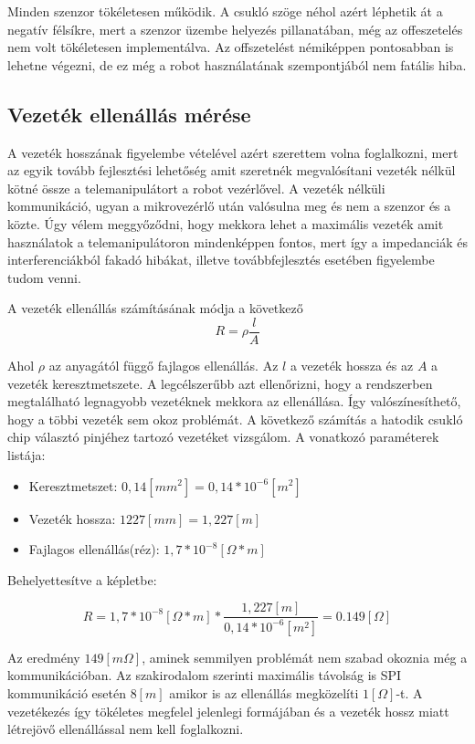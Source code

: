 Minden szenzor tökéletesen működik. A csukló szöge néhol azért léphetik át a negatív félsíkre, mert a szenzor üzembe helyezés pillanatában, még az offeszetelés nem volt tökéletesen implementálva. Az offszetelést némiképpen pontosabban is lehetne végezni, de ez még a robot használatának szempontjából nem fatális hiba.


\subsection{Vezeték ellenállás mérése}

A vezeték hosszának figyelembe vételével azért szerettem volna foglalkozni, mert az egyik tovább fejlesztési lehetőség amit szeretnék megvalósítani vezeték nélkül kötné össze a telemanipulátort a robot vezérlővel. A vezeték nélküli kommunikáció, ugyan a mikrovezérlő után valósulna meg és nem a szenzor és a közte. Úgy vélem meggyőződni, hogy mekkora lehet a maximális vezeték amit használatok a telemanipulátoron mindenképpen fontos, mert így a impedanciák és interferenciákból fakadó hibákat, illetve továbbfejlesztés esetében figyelembe tudom venni.\cite{vezetekellen}

A vezeték ellenállás számításának módja a következő
\begin{equation}
R=\rho\frac{l}{A}
\end{equation}

Ahol $\rho$ az anyagától függő fajlagos ellenállás. Az $l$ a vezeték hossza és az $A$ a vezeték keresztmetszete. A legcélszerűbb  azt ellenőrizni, hogy a rendszerben megtalálható legnagyobb vezetéknek mekkora az ellenállása. Így valószínesíthető, hogy a többi vezeték sem okoz problémát. A következő számítás a hatodik csukló chip választó pinjéhez tartozó vezetéket vizsgálom. A vonatkozó paraméterek listája:\cite{vezetekellen}

\begin{itemize}
\item Keresztmetszet: $0,14[mm^{2}]=0,14*10^{-6}[m^{2}]$
\item Vezeték hossza: $1227[mm]=1,227[m]$
\item Fajlagos ellenállás(réz): $1,7*10^{-8}[\Omega*m]$
\end{itemize}

Behelyettesítve a képletbe:

\begin{equation}
R=1,7*10^{-8}[\Omega *m]*\frac{1,227[m]}{0,14*10^{-6}[m^{2}]}=0.149[\Omega]
\end{equation}

Az eredmény  $149[m\Omega]$, aminek semmilyen problémát nem szabad okoznia még a kommunikációban. Az szakirodalom szerinti maximális távolság is SPI kommunikáció esetén $8[m]$ amikor is az ellenállás megközelíti $1[\Omega]$-t. A vezetékezés így tökéletes megfelel jelenlegi formájában és a vezeték hossz miatt létrejövő ellenállással nem kell foglalkozni.\cite{texaswire}\cite{vezetekellen}
